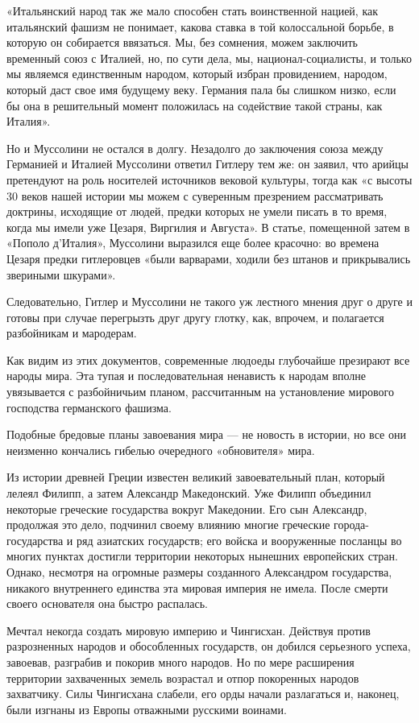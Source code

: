 \documentclass[12pt, a4paper, openany]{book}
\begin{document}
«Итальянский народ так же мало способен стать воинственной нацией, как итальянский фашизм не понимает, какова ставка в той колоссальной борьбе, в которую он собирается ввязаться. Мы, без сомнения, можем заключить временный союз с Италией, но, по сути дела, мы, национал-социалисты, и только мы являемся единственным народом, который избран провидением, народом, который даст свое имя будущему веку. Германия пала бы слишком низко, если бы она в решительный момент положилась на содействие такой страны, как Италия».

Но и Муссолини не остался в долгу. Незадолго до заключения союза между Германией и Италией Муссолини ответил Гитлеру тем же: он заявил, что арийцы претендуют на роль носителей источников вековой культуры, тогда как «с высоты 30 веков нашей истории мы можем с суверенным презрением рассматривать доктрины, исходящие от людей, предки которых не умели писать в то время, когда мы имели уже Цезаря, Виргилия и Августа». В статье, помещенной затем в «Пополо д’Италия», Муссолини выразился еще более красочно: во времена Цезаря предки гитлеровцев «были варварами, ходили без штанов и прикрывались звериными шкурами».

Следовательно, Гитлер и Муссолини не такого уж лестного мнения друг о друге и готовы при случае перегрызть друг другу глотку, как, впрочем, и полагается разбойникам и мародерам.

Как видим из этих документов, современные людоеды глубочайше презирают все народы мира. Эта тупая и последовательная ненависть к народам вполне увязывается с разбойничьим планом, рассчитанным на установление мирового господства германского фашизма.

Подобные бредовые планы завоевания мира — не новость в истории, но все они неизменно кончались гибелью очередного «обновителя» мира.

Из истории древней Греции известен великий завоевательный план, который лелеял Филипп, а затем Александр Македонский. Уже Филипп объединил некоторые греческие государства вокруг Македонии. Его сын Александр, продолжая это дело, подчинил своему влиянию многие греческие города-государства и ряд азиатских государств; его войска и вооруженные посланцы во многих пунктах достигли территории некоторых нынешних европейских стран. Однако, несмотря на огромные размеры созданного Александром государства, никакого внутреннего единства эта мировая империя не имела. После смерти своего основателя она быстро распалась.

Мечтал некогда создать мировую империю и Чингисхан. Действуя против разрозненных народов и обособленных государств, он добился серьезного успеха, завоевав, разграбив и покорив много народов. Но по мере расширения территории захваченных земель возрастал и отпор покоренных народов захватчику. Силы Чингисхана слабели, его орды начали разлагаться и, наконец, были изгнаны из Европы отважными русскими воинами.
\end{document}
